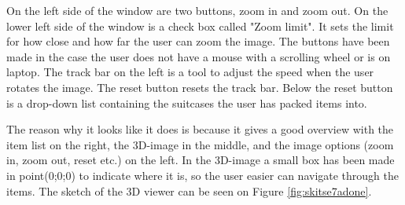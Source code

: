 On the left side of the window are two buttons, zoom in and zoom out. On the lower left side of the window is a check box called "Zoom limit". It sets the limit for how close and how far the user can zoom the image. The buttons have been made in the case the user does not have a mouse with a scrolling wheel or is on laptop. The track bar on the left is a tool to adjust the speed when the user rotates the image. The reset button resets the track bar. Below the reset button is a drop-down list containing the suitcases the user has packed items into.

The reason why it looks like it does is because it gives a good overview with the item list on the right, the 3D-image in the middle, and the image options (zoom in, zoom out, reset etc.) on the left.
In the 3D-image a small box has been made in point(0;0;0) to indicate where it is, so the user easier can navigate through the items.
The sketch of the 3D viewer can be seen on Figure \ref{fig:skitse7adone}.